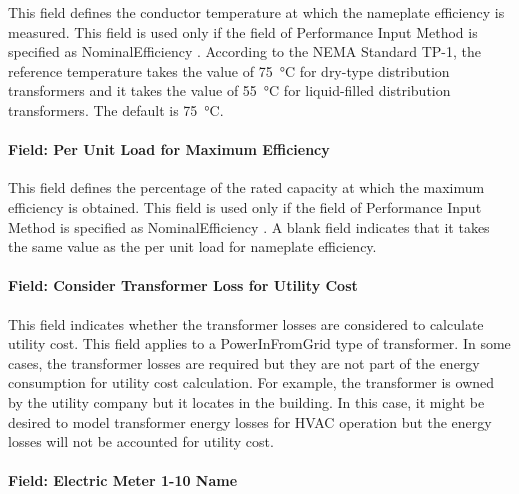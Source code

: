 This field defines the conductor temperature at which the nameplate efficiency is measured. This field is used only if the field of Performance Input Method is specified as NominalEfficiency . According to the NEMA Standard TP-1, the reference temperature takes the value of \SI{75}{\celsius} for dry-type distribution transformers and it takes the value of \SI{55}{\celsius} for liquid-filled distribution transformers. The default is \SI{75}{\celsius}.

\paragraph{Field: Per Unit Load for Maximum Efficiency}\label{field-per-unit-load-for-maximum-efficiency}

This field defines the percentage of the rated capacity at which the maximum efficiency is obtained. This field is used only if the field of Performance Input Method is specified as NominalEfficiency . A blank field indicates that it takes the same value as the per unit load for nameplate efficiency.

\paragraph{Field: Consider Transformer Loss for Utility Cost}\label{field-consider-transformer-loss-for-utility-cost}

This field indicates whether the transformer losses are considered to calculate utility cost. This field applies to a PowerInFromGrid type of transformer. In some cases, the transformer losses are required but they are not part of the energy consumption for utility cost calculation. For example, the transformer is owned by the utility company but it locates in the building. In this case, it might be desired to model transformer energy losses for HVAC operation but the energy losses will not be accounted for utility cost.

\paragraph{Field: Electric Meter 1-10 Name}\label{field-electric-meter-1-10-name}

